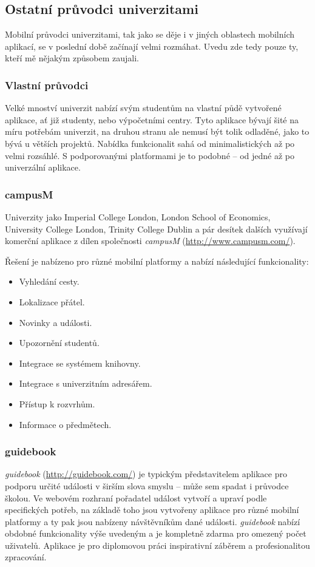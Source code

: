 \subsection{Ostatní průvodci univerzitami}
Mobilní průvodci univerzitami, tak jako se děje i v jiných oblastech mobilních aplikací, se v poslední době začínají velmi rozmáhat. Uvedu zde tedy pouze ty, kteří mě nějakým způsobem zaujali.

\subsubsection{Vlastní průvodci}
Velké mnoství univerzit nabízí svým studentům na vlastní půdě vytvořené aplikace, ať již studenty, nebo výpočetními centry. Tyto aplikace bývají šité na míru potřebám univerzit, na druhou stranu ale nemusí být tolik odladěné, jako to bývá u větších projektů. Nabídka funkcionalit sahá od minimalistických až po velmi rozsáhlé. S podporovanými platformami je to podobné -- od jedné až po univerzální aplikace.

\subsubsection{campusM}
Univerzity jako Imperial College London, London School of Economics, University College London, Trinity College Dublin a pár desítek dalších využívají komerční aplikace z dílen společnosti \emph{campusM} (\url{http://www.campusm.com/}).

Řešení je nabízeno pro různé mobilní platformy a nabízí následující funkcionality:
\begin{itemize}
\item Vyhledání cesty.
\item Lokalizace přátel.
\item Novinky a události.
\item Upozornění studentů.
\item Integrace se systémem knihovny.
\item Integrace s univerzitním adresářem.
\item Přístup k rozvrhům.
\item Informace o předmětech.
\end{itemize}

\subsubsection{guidebook}
\emph{guidebook} (\url{http://guidebook.com/}) je typickým představitelem aplikace pro podporu určité události v širším slova smyslu -- může sem spadat i průvodce školou. Ve webovém rozhraní pořadatel událost vytvoří a upraví podle specifických potřeb, na základě toho jsou vytvořeny aplikace pro různé mobilní platformy a ty pak jsou nabízeny návštěvníkům dané události. \textit{guidebook} nabízí obdobné funkcionality výše uvedeným a je kompletně zdarma pro omezený počet uživatelů. Aplikace je pro diplomovou práci inspirativní záběrem a profesionalitou zpracování.

